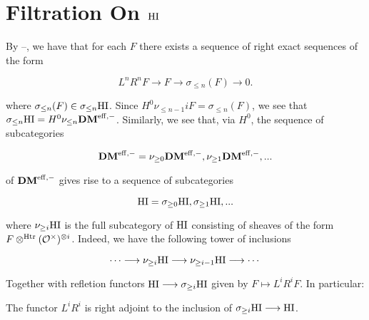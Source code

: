 \newcommand{\olDM}[1]{\sigma_{\leq #1}}
\newcommand{\ogDM}[1]{\sigma_{\geq #1}}
\newcommand{\nlDM}[1]{\nu_{\leq #1}}
\newcommand{\ngDM}[1]{\nu_{\geq #1}}
\newcommand{\ohomeHI}[0]{\underline{Hom}_{\sigma \geq i\HI}}
\newcommand{\torT}[0]{\mathbb{T}}
\newcommand{\torF}[0]{\mathbb{F}}
\newcommand{\xlongrightarrow}[1]{\stackrel{#1}{\longrightarrow}}
\newcommand{\homTorTn}[0]{\mathrm{Hom}_{\torT_n}}

\section{Filtration On $\mathrm{HI}$}

By --, we have that for each $F$ there exists a sequence of right 
exact sequences of the form 

\begin{equation}
L^nR^n F \longrightarrow F \longrightarrow \olDM{n}(F)
\longrightarrow 0.
\end{equation}

where $\olDM{n}(F) \in \olDM{n} \HI$. Since $H^0 \nlDM{n-1} iF = 
\olDM{n}(F)$, we see that $\olDM{n}\HI=H^0\nlDM{n}\DMm$. 
Similarly, we see that, via $H^0$, the sequence of subcategories

\begin{equation}
\DMm=\ngDM{0}\DMm,\ngDM{1}\DMm,... 
\end{equation}

of $\mathbf{DM}^{\mathrm{eff},-}$ gives rise to a sequence of subcategories

\begin{equation}
\HI=\ogDM{0} \HI, \ogDM{1} \HI, ...
\end{equation}

where $\ngDM{i} \HI$ is the full subcategory of $\mathrm{HI}$ consisting 
of sheaves of the form $F \otimes^{\mathrm{Htr}} (\mathcal{O}^{\times})^{\otimes i}$. Indeed, we have 
the following tower of inclusions

\begin{equation}
\cdots \longrightarrow \ngDM{i} \HI \longrightarrow \ngDM{i-1} \HI 
\longrightarrow \cdots
\end{equation}

Together with refletion functors $\HI \longrightarrow \ogDM{i} 
\HI$ given by $F \mapsto L^iR^i F$. In particular:

\begin{prop}\label{functer_prop}
The functor $L^iR^i$ is right adjoint to the inclusion of $\ogDM{i} 
\HI \longrightarrow \HI$.
\end{prop}

